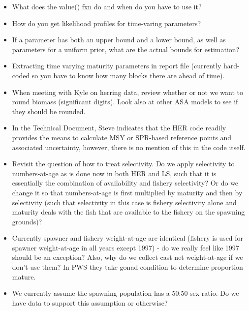 \documentclass[]{article}
\begin{document}
\begin{itemize}
\item
  What does the value() fxn do and when do you have to use it?
\item
  How do you get likelihood profiles for time-varing parameters?
\item
  If a parameter has both an upper bound and a lower bound, as well as
  parameters for a uniform prior, what are the actual bounds for
  estimation?
\item
  Extracting time varying maturity parameters in report file (currently
  hard-coded so you have to know how many blocks there are ahead of
  time).
\item
  When meeting with Kyle on herring data, review whether or not we want
  to round biomass (significant digits). Look also at other ASA models
  to see if they should be rounded.
\item
  In the Technical Document, Steve indicates that the HER code readily
  provides the means to calculate MSY or SPR-based reference points and
  associated uncertainty, however, there is no mention of this in the
  code itself.
\item
  Revisit the question of how to treat selectivity. Do we apply
  selectivity to numbers-at-age as is done now in both HER and LS, such
  that it is essentially the combination of availability and fishery
  selectivity? Or do we change it so that numbers-at-age is first
  multiplied by maturity and then by selectivity (such that selectivity
  in this case is fishery selectivity alone and maturity deals with the
  fish that are available to the fishery on the spawning grounds)?
\item
  Currently spawner and fishery weight-at-age are identical (fishery is
  used for spawner weight-at-age in all years except 1997) - do we
  really feel like 1997 should be an exception? Also, why do we collect
  cast net weight-at-age if we don't use them? In PWS they take gonad
  condition to determine proportion mature.
\item
  We currently assume the spawning population has a 50:50 sex ratio. Do
  we have data to support this assumption or otherwise?
\end{itemize}
\end{document}
